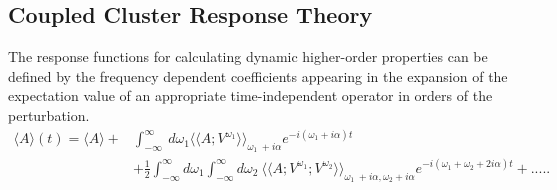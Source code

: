 \subsection{Coupled Cluster Response Theory}
The response functions for calculating dynamic higher-order properties 
can be defined by the frequency dependent coefficients appearing in the 
expansion of the expectation value of an appropriate time-independent 
operator in orders of the perturbation\cite{Koch90}.
\\
\begin{equation}
\begin{split}
\langle A \rangle (t) = \langle A \rangle + & \int_{-\infty}^{\infty}\
d\omega_1{\langle\langle A;V^{\omega_1}\rangle\rangle}_{\omega_1  \
+ i\alpha}e^{-i(\omega_1 + i\alpha)t} \\
& + \frac{1}{2} \int_{-\infty}^{\infty}d\omega_1\int_{-\infty}^{\infty}d\omega_2\
{\langle\langle A;V^{\omega_1};V^{\omega_2}\rangle\rangle}_{\omega_1 \
+ i\alpha,\omega_2 + i\alpha}e^{-i(\omega_1 + \omega_2 + 2i\alpha)t} + .....
\end{split}
\end{equation}
\\

